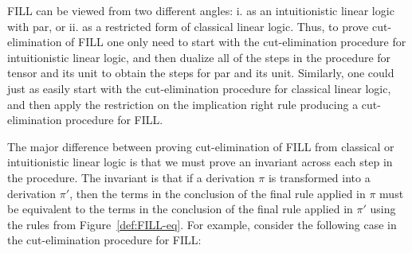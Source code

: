 FILL can be viewed from two different angles: i. as an intuitionistic
linear logic with par, or ii. as a restricted form of classical linear
logic.  Thus, to prove cut-elimination of FILL one only need to start
with the cut-elimination procedure for intuitionistic linear logic,
and then dualize all of the steps in the procedure for tensor and its
unit to obtain the steps for par and its unit.  Similarly, one could
just as easily start with the cut-elimination procedure for classical
linear logic, and then apply the restriction on the implication right
rule producing a cut-elimination procedure for FILL.

The major difference between proving cut-elimination of FILL from
classical or intuitionistic linear logic is that we must prove an
invariant across each step in the procedure.  The invariant is that if
a derivation $\pi$ is transformed into a derivation $\pi'$, then the
terms in the conclusion of the final rule applied in $\pi$ must be
equivalent to the terms in the conclusion of the final rule applied in
$\pi'$ using the rules from Figure~\ref{def:FILL-eq}.  For example,
consider the following case in the cut-elimination procedure for FILL:

